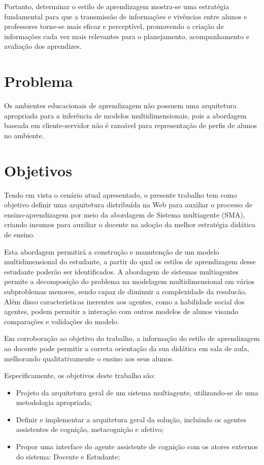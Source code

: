 Portanto, determinar o estilo de aprendizagem mostra-se uma estratégia fundamental para que a transmissão de informações e vivências entre alunos e professores torne-se mais eficaz e perceptível, promovendo a criação de informações cada vez mais relevantes para o planejamento, acompanhamento e avaliação dos aprendizes.


\section{Problema}
Os ambientes educacionais de aprendizagem não possuem uma arquitetura apropriada para a inferência de modelos multidimensionais, pois a abordagem baseada em cliente-servidor não é razoável para representação de perfis de alunos no ambiente.

\section{Objetivos}
Tendo em vista o cenário atual apresentado, o presente trabalho tem como objetivo definir uma arquitetura distribuída na Web para auxiliar o processo de ensino-aprendizagem por meio da abordagem de Sistema multiagente (SMA), criando insumos para auxiliar o docente na adoção da melhor estratégia didática de ensino.

Esta abordagem permitirá a construção e manutenção de um modelo multidimensional do estudante, a partir do qual os estilos de aprendizagem desse estudante poderão ser identificados. A abordagem de sistemas multiagentes permite a decomposição do problema na modelagem multidimensional em vários subproblemas menores, sendo capaz de diminuir a complexidade da resolucão. Além disso características inerentes aos agentes, como a habilidade social dos agentes, podem permitir a interação com outros modelos de alunos visando comparações e validações do modelo.

Em corroboração ao objetivo do trabalho, a informação do estilo de aprendizagem ao docente pode permitir a correta orientação da sua didática em sala de aula, melhorando qualitativamente o ensino aos seus alunos.

Especificamente, os objetivos deste trabalho são:
\begin{itemize}
 	\item Projeto da arquitetura geral de um sistema multiagente, utilizando-se de uma metodologia apropriada;
	\item Definir e implementar a arquitetura geral da solução, incluindo os agentes assistentes de cognição, metacognição e afetivo;
	\item Propor uma interface do agente assistente de cognição com os atores externos do sistema: Docente e Estudante;
\end{itemize}

